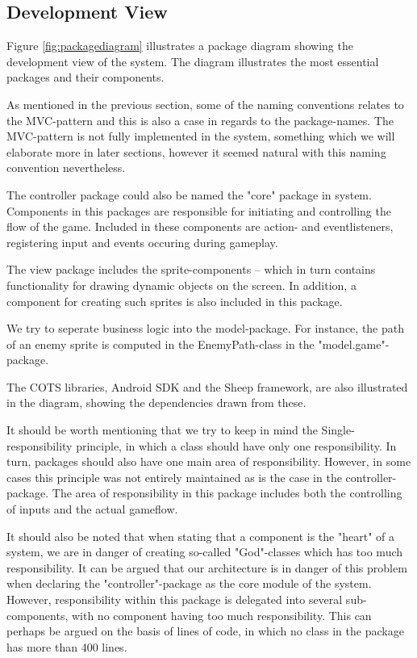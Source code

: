 \subsection{Development View}
Figure \ref{fig:packagediagram} illustrates a package diagram showing the development view of the system. The diagram illustrates the most essential packages and their components.

As mentioned in the previous section, some of the naming conventions relates to the MVC-pattern and this is also a case in regards to the package-names. The MVC-pattern is not fully implemented in the system, something which we will elaborate more in later sections, however it seemed natural with this naming convention nevertheless.

The controller package could also be named the "core" package in system. Components in this packages are responsible for initiating and controlling the flow of the game. Included in these components are action- and eventlisteners, registering input and events occuring during gameplay.

The view package includes the sprite-components -- which in turn contains functionality for drawing dynamic objects on the screen. In addition, a component for creating such sprites is also included in this package.

We try to seperate business logic into the model-package. For instance, the path of an enemy sprite is computed in the EnemyPath-class in the "model.game"-package. 

The COTS libraries, Android SDK and the Sheep framework, are also illustrated in the diagram, showing the dependencies drawn from these.

It should be worth mentioning that we try to keep in mind the Single-responsibility principle, in which a class should have only one responsibility. In turn, packages should also have one main area of responsibility. However, in some cases this principle was not entirely maintained as is the case in the controller-package. The area of responsibility in this package includes both the controlling of inputs and the actual gameflow. 

It should also be noted that when stating that a component is the "heart" of a system, we are in danger of creating so-called "God"-classes which has too much responsibility. It can be argued that our architecture is in danger of this problem when declaring the "controller"-package as the core module of the system. However, responsibility within this package is delegated into several sub-components, with no component having too much responsibility. This can perhaps be argued on the basis of lines of code, in which no class in the package has more than 400 lines.



